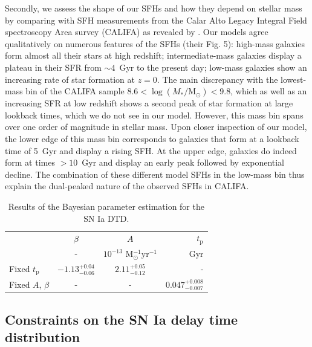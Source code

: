\documentclass[fleqn,usenatbib]{mnras}
\begin{document}
Secondly, we assess the shape of our SFHs and how they depend on stellar mass by comparing with SFH measurements from the Calar Alto Legacy Integral Field spectroscopy Area survey (CALIFA) as revealed by \citet{GonzalezDelgado2017}. Our models agree qualitatively on numerous features of the SFHs (their Fig. 5): high-mass galaxies form almost all their stars at high redshift; intermediate-mass galaxies display a plateau in their SFR from $\sim4$~Gyr to the present day; low-mass galaxies show an increasing rate of star formation at $z=0$. The main discrepancy with the lowest-mass bin of the CALIFA sample $8.6 <\log (M_*/\mathrm{M}_{\odot})<9.8$, which as well as an increasing SFR at low redshift shows a second peak of star formation at large lookback times, which we do not see in our model. However, this mass bin spans over one order of magnitude in stellar mass. Upon closer inspection of our model, the lower edge of this mass bin corresponds to galaxies that form at a lookback time of 5~Gyr and display a rising SFH. At the upper edge, galaxies do indeed form at times $>10$~Gyr and display an early peak followed by exponential decline. The combination of these different model SFHs in the low-mass bin thus explain the dual-peaked nature of the observed SFHs in CALIFA.

\renewcommand{\arraystretch}{1.2}
\begin{table}
	\centering
	\caption{Results of the Bayesian parameter estimation for the SN Ia DTD.}
	\label{tab:dtd_results}
	\begin{tabular}{lccr} %
		\hline
		 &$\beta$ & $A$ & $t_{\mathrm{p}}$\\
		 &-       & $10^{-13}$ M$_{\odot}^{-1}$yr$^{-1}$ & Gyr \\
		\hline
		Fixed $t_{\mathrm{p}}$ & $-1.13^{+0.04}_{-0.06}$ &  $2.11^{+0.05}_{-0.12}$ & -\\
		Fixed $A$, $\beta$ & - & - & $0.047_{-0.007}^{+0.008}$\\
		\hline
	\end{tabular}
\end{table}

\subsection{Constraints on the SN Ia delay time distribution}
\label{subsec:results_dtd}
\end{document}
